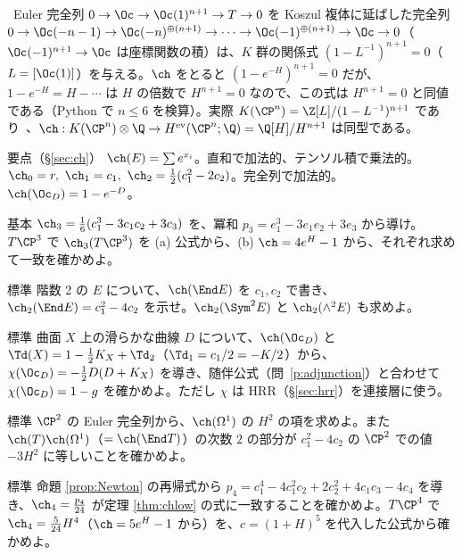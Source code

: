 \begin{ex}[$K(\CP^n)$ と $\ch$]\label{ex:KPn}\tP\
Euler 完全列 $0\to\Oc\to\Oc(1)^{n+1}\to T\to0$ を Koszul 複体に延ばした完全列 $0\to\Oc(-n-1)\to\Oc(-n)^{\oplus(n+1)}\to\cdots\to\Oc(-1)^{\oplus(n+1)}\to\Oc\to0$（$\Oc(-1)^{n+1}\to\Oc$ は座標関数の積）は、$K$ 群の関係式 $(1-L^{-1})^{n+1}=0$（$L=[\Oc(1)]$）を与える。$\ch$ をとると $(1-e^{-H})^{n+1}=0$ だが、$1-e^{-H}=H-\cdots$ は $H$ の倍数で $H^{n+1}=0$ なので、この式は $H^{n+1}=0$ と同値である（Python で $n\le6$ を検算）。実際 $K(\CP^n)=\Z[L]/(1-L^{-1})^{n+1}$ であり\tC\ 、$\ch:K(\CP^n)\otimes\Q\to H^{\rm ev}(\CP^n;\Q)=\Q[H]/H^{n+1}$ は同型である。
\end{ex}
\begin{keybox}{要点（\S\ref{sec:ch}）}
$\ch(E)=\sum e^{x_i}$。直和で加法的、テンソル積で乗法的。$\ch_0=r,\ \ch_1=c_1,\ \ch_2=\frac12(c_1^2-2c_2)$。完全列で加法的。$\ch(\Oc_D)=1-e^{-D}$。
\end{keybox}
\begin{prob}{基本}\label{p:chlow}
$\ch_3=\frac16(c_1^3-3c_1c_2+3c_3)$ を、冪和 $p_3=e_1^3-3e_1e_2+3e_3$ から導け。$T\CP^3$ で $\ch_3(T\CP^3)$ を (a) 公式から、(b) $\ch=4e^H-1$ から、それぞれ求めて一致を確かめよ。
\end{prob}
\begin{prob}{標準}\label{p:chEnd}
階数 2 の $E$ について、$\ch(\End E)$ を $c_1,c_2$ で書き、$\ch_2(\End E)=c_1^2-4c_2$ を示せ。$\ch_2(\Sym^2E)$ と $\ch_2(\wedge^2E)$ も求めよ。
\end{prob}
\begin{prob}{標準}\label{p:chOD}
曲面 $X$ 上の滑らかな曲線 $D$ について、$\ch(\Oc_D)$ と $\Td(X)=1-\frac12K_X+\Td_2$（$\Td_1=c_1/2=-K/2$）から、$\chi(\Oc_D)=-\frac12D(D+K_X)$ を導き、随伴公式（問~\ref{p:adjunction}）と合わせて $\chi(\Oc_D)=1-g$ を確かめよ。ただし $\chi$ は HRR（\S\ref{sec:hrr}）を連接層に使う。
\end{prob}
\begin{prob}{標準}\label{p:chEuler}
$\CP^2$ の Euler 完全列から、$\ch(\Omega^1)$ の $H^2$ の項を求めよ。また $\ch(T)\ch(\Omega^1)$（$=\ch(\End T)$）の次数 $2$ の部分が $c_1^2-4c_2$ の $\CP^2$ での値 $-3H^2$ に等しいことを確かめよ。
\end{prob}


\begin{prob}{標準}\label{p:Newton}
命題 \ref{prop:Newton} の再帰式から $p_4=c_1^4-4c_1^2c_2+2c_2^2+4c_1c_3-4c_4$ を導き、$\ch_4=\frac{p_4}{24}$ が定理 \ref{thm:chlow} の式に一致することを確かめよ。$T\CP^4$ で $\ch_4=\frac5{24}H^4$（$\ch=5e^H-1$ から）を、$c=(1+H)^5$ を代入した公式から確かめよ。
\end{prob}
